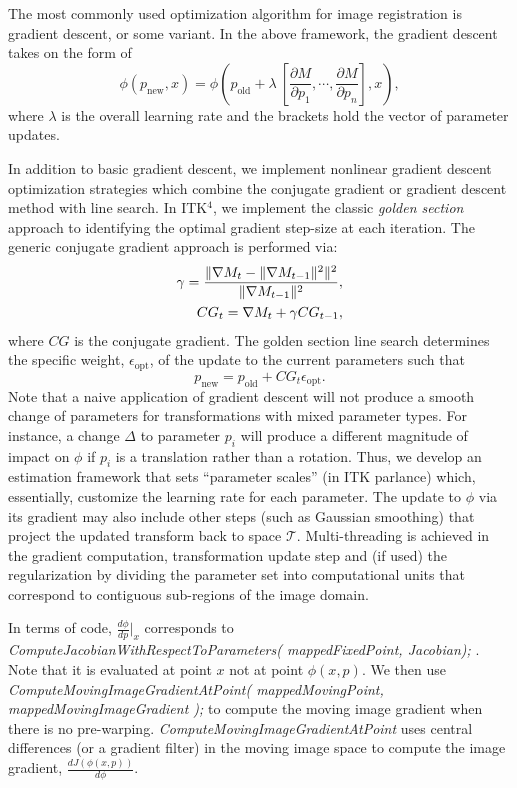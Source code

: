 \documentclass{frontiersSCNS}
\begin{document}
The most commonly used optimization algorithm for image registration
is gradient descent, or some variant.   In the above framework, the
gradient descent takes on the form of
$$
\phi(p_\text{new},x)=\phi(p_\text{old}+\lambda~[ \frac{\partial
  M}{\partial p_1} , \cdots , \frac{\partial
  M}{\partial p_n} ] ,  x ),
$$
where $\lambda$ is the overall learning rate and the brackets hold the
vector of parameter updates.  

In addition to basic gradient descent, we implement nonlinear gradient
descent optimization strategies which combine the conjugate gradient
or gradient descent method with line search.  In ITK$^4$, we implement the classic {\em
  golden section} approach to identifying the optimal gradient
step-size at each iteration.  The generic conjugate gradient approach
is performed via: 
\begin{align}
\gamma=\frac{\|\nabla M_{t}-\|\nabla M_{t-1}\|^2\|^2}{\|\nabla
  M_{t-1}\|^2}, \\ \notag
CG_t = \nabla M_t + \gamma CG_{t-1},
\end{align}
where $CG$ is the conjugate gradient.  The golden section line search
determines the specific weight, $\epsilon_\text{opt}$, of the update to the current parameters
such that 
$$ 
p_{\text{new}}=p_{\text{old}}+CG_t \epsilon_\text{opt}.
$$
Note that a naive application of gradient descent will not produce a smooth
change of parameters for transformations with mixed parameter types.
For instance, a change $\Delta$ to parameter $p_i$ will produce a
different magnitude of impact on $\phi$ if $p_i$ is a translation rather than a
rotation.  Thus, we develop an estimation framework that sets
``parameter scales'' (in ITK parlance) which, essentially, customize
the learning rate for each parameter.  The update to
$\phi$ via its gradient may also include other steps (such as Gaussian
smoothing) that project the updated transform back to space
$\mathcal{T}$.  Multi-threading is achieved in the gradient computation, transformation update
step and (if used) the regularization by dividing the parameter set
into computational units that correspond to contiguous sub-regions of the image domain.

In terms of code, $\frac{d\phi}{dp}|_x$ corresponds to {\em
ComputeJacobianWithRespectToParameters( mappedFixedPoint, Jacobian);
}.  Note that it is evaluated at point $x$ not at point $\phi(x,p)$.  We
then use {\em
ComputeMovingImageGradientAtPoint( mappedMovingPoint,
mappedMovingImageGradient );} to compute the moving image gradient
when there is no pre-warping.  {\em ComputeMovingImageGradientAtPoint} uses central
differences (or a gradient filter) in the moving image space to
compute the image gradient, $\frac{dJ(\phi(x,p))}{d\phi}$.
\end{document}
